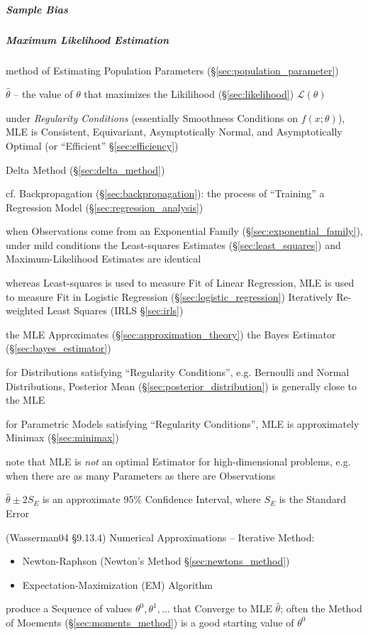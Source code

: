 \subparagraph{Sample Bias}\label{sec:sample_bias}\hfill

\subparagraph{Maximum Likelihood Estimation}\label{sec:mle}\hfill

method of Estimating Population Parameters (\S\ref{sec:population_parameter})

$\hat{\theta}$ -- the value of $\theta$ that maximizes the Likilihood
(\S\ref{sec:likelihood}) $\mathcal{L}(\theta)$

under \emph{Regularity Conditions} (essentially Smoothness Conditions on
$f(x; \theta)$), MLE is Consistent, Equivariant, Asymptotically Normal, and
Asymptotically Optimal (or ``Efficient'' \S\ref{sec:efficiency})

\fist Delta Method (\S\ref{sec:delta_method})

cf. Backpropagation (\S\ref{sec:backpropagation}): the process of ``Training'' a
Regression Model (\S\ref{sec:regression_analysis})

when Observations come from an Exponential Family
(\S\ref{sec:exponential_family}), under mild conditions the Least-squares
Estimates (\S\ref{sec:least_squares}) and Maximum-Likelihood Estimates are
identical

whereas Least-squares is used to measure Fit of Linear Regression, MLE is used
to measure Fit in Logistic Regression (\S\ref{sec:logistic_regression}) \fist
Iteratively Re-weighted Least Squares (IRLS \S\ref{sec:irls})

the MLE Approximates (\S\ref{sec:approximation_theory}) the Bayes Estimator
(\S\ref{sec:bayes_estimator})

for Distributions satisfying ``Regularity Conditions'', e.g. Bernoulli and
Normal Distributions, Posterior Mean (\S\ref{sec:posterior_distribution}) is
generally close to the MLE

for Parametric Models satisfying ``Regularity Conditions'', MLE is approximately
Minimax (\S\ref{sec:minimax})

note that MLE is \emph{not} an optimal Estimator for high-dimensional problems,
e.g. when there are as many Parameters as there are Observations

$\hat{\theta} \pm 2\hat{S_E}$ is an approximate 95\% Confidence Interval, where
$S_E$ is the Standard Error

(Wasserman04 \S9.13.4) Numerical Approximations -- Iterative Method:
\begin{itemize}
  \item Newton-Raphson (Newton's Method \S\ref{sec:newtons_method})
  \item Expectation-Maximization (EM) Algorithm
\end{itemize}
produce a Sequence of values $\theta^0, \theta^1, \ldots$ that Converge to MLE
$\hat{\theta}$;
often the Method of Moements (\S\ref{sec:moments_method}) is a good starting
value of $\theta^0$

